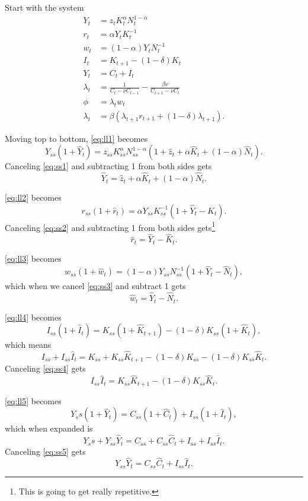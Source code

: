 \documentclass[11pt]{article}
\numberwithin{equation}{section} %
\numberwithin{figure}{section} %
\numberwithin{table}{section} %
\theoremstyle{definition}
\begin{document}
Start with the system
\begin{align}
    Y_t &= z_t K_t^\alpha N_t^{1-\alpha} \label{eq:ll1} \\
    r_t &= \alpha Y_t K_t^{-1} \label{eq:ll2} \\
    w_t &= (1 - \alpha) Y_t N_t^{-1} \label{eq:ll3} \\
    I_t &= K_{t + 1} - (1 - \delta) K_t \label{eq:ll4} \\
    Y_t &= C_t + I_t \label{eq:ll5} \\
    \lambda_t &= \frac{1}{C_t - \nu C_{t-1}} - \frac{\beta \nu}{C_{t+1} - \nu C_t} \label{eq:ll6} \\
    \phi &= \lambda_t w_t \label{eq:ll7} \\
    \lambda_t &= \beta(\lambda_{t+1} r_{t+1} + (1-\delta) \lambda_{t+1}). \label{eq:ll8}
\end{align}

Moving top to bottom, \ref{eq:ll1} becomes
\[
    Y_{ss} (1+\hat{Y}_t) = z_{ss} K_{ss}^\alpha N_{ss}^{1-\alpha} (1 + \hat{z}_t + \alpha \hat{K}_t + (1-\alpha) \hat{N}_t).
\]
Canceling \ref{eq:ss1} and subtracting 1 from both sides gets
\[
    \hat{Y}_t = \hat{z}_t + \alpha \hat{K}_t + (1-\alpha) \hat{N}_t.
\]

\ref{eq:ll2} becomes
\[
    r_{ss} (1 + \hat{r}_t) = \alpha Y_{ss} K_{ss}^{-1} (1 + \hat{Y}_t - \hat{K}_t).
\]
Canceling \ref{eq:ss2} and subtracting 1 from both sides gets\footnote{This is going to get really repetitive.}
\[
    \hat{r}_t = \hat{Y}_t - \hat{K}_t.
\]

\ref{eq:ll3} becomes
\[
    w_{ss} (1 + \hat{w}_t) = (1 - \alpha) Y_{ss} N_{ss}^{-1} (1 + \hat{Y}_t - \hat{N}_t),
\]
which when we cancel \ref{eq:ss3} and subtract 1 gets
\[
    \hat{w}_t = \hat{Y}_t - \hat{N}_t.
\]

\ref{eq:ll4} becomes
\[
    I_{ss} (1 + \hat{I}_t) = K_{ss} (1 + \hat{K}_{t + 1}) - (1 - \delta) K_{ss} (1 + \hat{K}_t),
\]
which means
\[
    I_{ss} + I_{ss} \hat{I}_t = K_{ss} + K_{ss} \hat{K}_{t + 1} - (1 - \delta) K_{ss} - (1 - \delta) K_{ss} \hat{K}_t.
\]
Canceling \ref{eq:ss4} gets
\[
    I_{ss} \hat{I}_t = K_{ss} \hat{K}_{t + 1} - (1 - \delta) K_{ss} \hat{K}_t.
\]

\ref{eq:ll5} becomes
\[
    Y_ss (1 + \hat{Y}_t) = C_{ss} (1 + \hat{C}_t) + I_{ss} (1 + \hat{I}_t),
\]
which when expanded is
\[
    Y_ss + Y_{ss} \hat{Y}_t = C_{ss} + C_{ss} \hat{C}_t + I_{ss} + I_{ss} \hat{I}_t.
\]
Canceling \ref{eq:ss5} gets
\[
    Y_{ss} \hat{Y}_t = C_{ss} \hat{C}_t + I_{ss} \hat{I}_t.
\]
\end{document}
